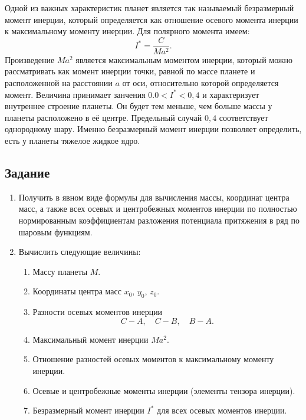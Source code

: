 \documentclass[11pt, a4paper,addpoints]{exam}
\theoremstyle{remark}
\begin{document}
    Одной из важных характеристик планет является так называемый безразмерный момент инерции,
    который определяется как отношение осевого момента инерции к максимальному моменту инерции. Для
    полярного момента имеем:
    \begin{equation*}
        I^* = \dfrac{C}{Ma^2}.
    \end{equation*}
    Произведение $Ma^2$ является максимальным моментом инерции, который можно рассматривать как
    момент инерции точки, равной по массе планете и расположенной на расстоянии $a$ от оси,
    относительно которой определяется момент. Величина принимает занчения $0.0 < I^* < 0,4$ и
    характеризует внутреннее строение планеты. Он будет тем меньше, чем больше массы у планеты
    расположено в её центре. Предельный случай $0,4$ соответствует однородному
    шару. Именно безразмерный момент инерции позволяет определить, есть у планеты
    тяжелое жидкое ядро. 
    \subsection*{\centering Задание}
    \begin{enumerate}
        \item Получить в явном виде формулы для вычисления массы, координат центра масс, 
            а также всех осевых и центробежных моментов
            инерции по полностью нормированным коэффициентам разложения потенциала притяжения в ряд
            по шаровым функциям.
        \item Вычислить следующие величины: 
            \begin{enumerate}
                \item Массу планеты $M$.
                \item Координаты центра масс $x_0$, $y_0$, $z_0$.
                \item Разности осевых моментов инерции
                    \begin{equation*}
                        C - A, \quad C - B, \quad B - A.
                    \end{equation*}
                \item Максимальный момент инерции $Ma^2$.
                \item Отношение разностей осевых моментов к максимальному моменту инерции.
                \item Осевые и центробежные моменты инерции (элементы тензора инерции).
                \item Безразмерный момент инерции $I^*$ для всех осевых моментов инерции.
            \end{enumerate}
    \end{enumerate}
\printbibliography
\end{document}
